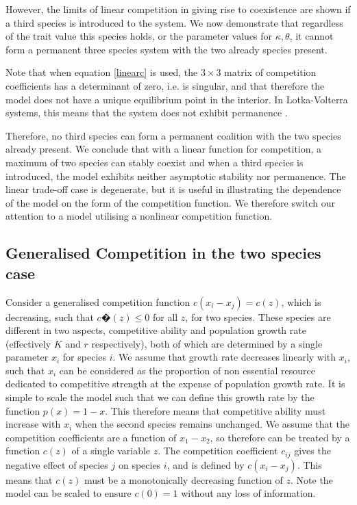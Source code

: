 However, the limits of linear competition in giving rise to coexistence are shown if a third species is introduced to the system. We now demonstrate that regardless of the trait value this species holds, or the parameter values for $\kappa, \theta$, it cannot form a permanent three species system with the two already species present.  

Note that when equation \eqref{linearc} is used, the $3\times 3$ matrix of competition coefficients has a determinant of zero, i.e. is singular, and that therefore the model does not have a unique equilibrium point in the interior. In Lotka-Volterra systems, this means that the system does not exhibit permanence \citep[Theorem 13.5.1 in ][]{hofandsig}.

Therefore, no third species can form a permanent coalition with the two species already present. We conclude that with a linear function for competition, a maximum of two species can stably coexist and when a third species is introduced, the model exhibits neither asymptotic stability nor permanence. The linear trade-off case is degenerate, but it is useful in illustrating the dependence of the model on the form of the competition function. We therefore switch our attention to a model utilising a nonlinear competition function.

\subsection{Generalised Competition in the two species case}
Consider a generalised competition function $c(x_i - x_j)=c(z)$, which is decreasing, such that $c�(z)\leq0$ for all $z$, for two species. These species are different in two aspects, competitive ability and population growth rate (effectively $K$ and $r$ respectively), both of which are determined by a single parameter $x_i$ for species $i$. We assume that growth rate decreases linearly with $x_i$, such that $x_i$ can be considered as the proportion of non essential resource dedicated to competitive strength at the expense of population growth rate. It is simple to scale the model such that we can define this growth rate by the function $p(x)=1-x$. This therefore means that competitive ability must increase with $x_i$ when the second species remains unchanged. We assume that the competition coefficients are a function of $x_1-x_2$, so therefore can be treated by a function $c(z)$ of a single variable $z$. The competition coefficient $c_{ij}$ gives the negative effect of species $j$ on species $i$, and is defined by $c(x_i-x_j)$. This means that $c(z)$ must be a monotonically decreasing function of $z$. Note the model can be scaled to ensure $c(0)=1$ without any loss of information. 

